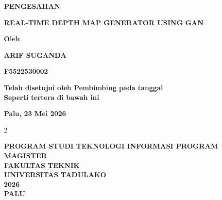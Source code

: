 \begin{center}
    {\fontsize{14pt}{16pt}\selectfont\textbf{PENGESAHAN}}

    \vspace{2cm}

    {\fontsize{14pt}{16pt}\selectfont\textbf{REAL-TIME DEPTH MAP GENERATOR USING GAN}}

    \vspace{2cm}

    {\fontsize{12pt}{18pt}\selectfont\textbf{Oleh}}

    {\fontsize{12pt}{18pt}\selectfont\textbf{ARIF SUGANDA}}

    {\fontsize{12pt}{18pt}\selectfont\textbf{F5522530002}}

    \vspace{2cm}

    {\fontsize{12pt}{18pt}\selectfont\textbf{Telah disetujui oleh Pembimbing pada tanggal\\
Seperti tertera di bawah ini}}

    \vspace{2cm}

    {\fontsize{12pt}{18pt}\selectfont\textbf{Palu, 23 Mei 2026}}

    \vspace{2cm}

    \begin{multicols}{2}
        \begin{center}
            {\fontsize{12pt}{18pt}\selectfont{Andi Hendra, PhD\\Pembimbing Utama}}

            {\fontsize{12pt}{18pt}\selectfont{Dr. Ir. M. Yazdi Pusadan, S.Kom., M.Eng.\\Pembimbing Anggota}}
        \end{center}
    \end{multicols}

    \vspace{3cm}

    {\fontsize{14pt}{16pt}\selectfont\textbf{
        PROGRAM STUDI TEKNOLOGI INFORMASI PROGRAM MAGISTER\\
        FAKULTAS TEKNIK\\
        UNIVERSITAS TADULAKO\\
        2026\\
        PALU
    }}
\end{center}